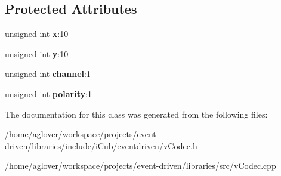 \subsection*{Protected Attributes}
\begin{DoxyCompactItemize}
\item 
unsigned int {\bfseries x}\+:10\hypertarget{classev_1_1AddressEvent_ab6015dc7a789cb6ff7546c47d58829bf}{}\label{classev_1_1AddressEvent_ab6015dc7a789cb6ff7546c47d58829bf}

\item 
unsigned int {\bfseries y}\+:10\hypertarget{classev_1_1AddressEvent_a2e6918d9a0c935c2424e8096ed610c6f}{}\label{classev_1_1AddressEvent_a2e6918d9a0c935c2424e8096ed610c6f}

\item 
unsigned int {\bfseries channel}\+:1\hypertarget{classev_1_1AddressEvent_ab96b9ac3a42cf1d69859f1edbea9cc7f}{}\label{classev_1_1AddressEvent_ab96b9ac3a42cf1d69859f1edbea9cc7f}

\item 
unsigned int {\bfseries polarity}\+:1\hypertarget{classev_1_1AddressEvent_a79bbcea834183012aa39e9d4b2c594ed}{}\label{classev_1_1AddressEvent_a79bbcea834183012aa39e9d4b2c594ed}

\end{DoxyCompactItemize}


The documentation for this class was generated from the following files\+:\begin{DoxyCompactItemize}
\item 
/home/aglover/workspace/projects/event-\/driven/libraries/include/i\+Cub/eventdriven/v\+Codec.\+h\item 
/home/aglover/workspace/projects/event-\/driven/libraries/src/v\+Codec.\+cpp\end{DoxyCompactItemize}
